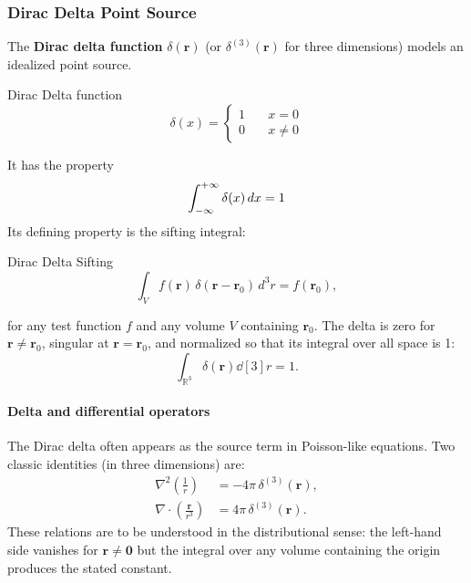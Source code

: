 		\subsubsection{Dirac Delta Point Source}
			The \textbf{Dirac delta function} $\delta(\mathbf{r})$ (or $\delta^{(3)}(\mathbf r)$ for three dimensions) models an idealized point source. 
			\begin{definition}{Dirac Delta function}
			    \begin{equation}
			        \delta(x) = \begin{cases}
						1 \quad &x = 0\\
						0 \quad &x\neq 0
			        \end{cases}
			    \end{equation}
			\end{definition}
			It has the property
			\begin{equation}
				\int_{-\infty}^{+\infty} \delta(x) \dd{x} = 1
			\end{equation}
			Its defining property is the sifting integral:
			\begin{definition}{Dirac Delta Sifting}
				\begin{equation}
					\int_V f(\mathbf{r})\,\delta(\mathbf{r}-\mathbf{r}_0)\, d^3r = f(\mathbf{r}_0),
				\end{equation}
			\end{definition}
			for any test function $f$ and any volume $V$ containing $\mathbf r_0$. The delta is zero for $\mathbf r\neq\mathbf r_0$, singular at $\mathbf r=\mathbf r_0$, and normalized so that its integral over all space is 1:
			\begin{equation}
				\int_{\mathbb{R}^3} \delta(\mathbf r) \dd[3]{r} = 1.
			\end{equation}

			\paragraph{Delta and differential operators}
			The Dirac delta often appears as the source term in Poisson-like equations. Two classic identities (in three dimensions) are:
			\begin{align}
				\nabla^2\!\left(\frac{1}{r}\right) &= -4\pi \,\delta^{(3)}(\mathbf r), \label{eq:lap1r}\\
				\nabla\!\cdot\!\left(\frac{\mathbf r}{r^3}\right) &= 4\pi \,\delta^{(3)}(\mathbf r). \label{eq:divrhat}
			\end{align}
			These relations are to be understood in the distributional sense: the left-hand side vanishes for $\mathbf r\neq\mathbf 0$ but the integral over any volume containing the origin produces the stated constant.

